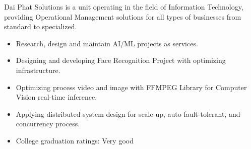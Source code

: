 \documentclass[10pt,a4paper,ragged2e,withhyper]{altacv}
\begin{document}
\begin{paracol}{2}
\bigskip

\divider

\medskip 


\begin{minipage}{\linewidth}
\justifying
    Dai Phat Solutions is a unit operating in the field of Information Technology, providing Operational Management solutions for all types of businesses from standard to specialized.
\end{minipage}
\medskip
\begin{itemize}
	\item Research, design and maintain AI/ML projects as services.
	\item Designing and developing Face Recognition Project with optimizing infrastructure.
	\item Optimizing process video and image with FFMPEG Library for Computer Vision real-time inference.
	\item Applying distributed system design for scale-up, auto fault-tolerant, and concurrency process.
\end{itemize}

\smallskip

\divider

\medskip 

\switchcolumn

\begin{itemize}
	\item College graduation ratings: Very good
\end{itemize}
\smallskip



\divider


\divider


\end{paracol}
\end{document}
